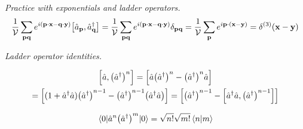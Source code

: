\documentclass{report}
\begin{document}
\begin{subquests}
	\item \emph{Practice with exponentials and ladder operators.}
	\begin{gather*}
		\frac{1}{\cal{V}}\sum_{\vb{pq}} e^{i\pqty{\vb p \cdot\vb x - \vb q \cdot \vb y}}\bqty{\hat{a}_{\vb p}, \hat{a}_{\vb q}^{\dagger}} = \frac{1}{\cal{V}}\sum_{\vb{pq}} e^{i\pqty{\vb p \cdot \vb x - \vb q \cdot \vb y}}\delta_{\vb{pq}} = \frac{1}{\cal{V}}\sum_{\vb p}e^{i \vb p \cdot\pqty{\vb x-\vb y}} = \delta^{(3)}(\vb x - \vb y)
	\end{gather*}

	\item \emph{Ladder operator identities.}
	\begin{subquests}
		\item
		\begin{gather*}
			\bqty{\hat{a},\pqty{\hat{a}^{\dagger}}^n} = \bqty{\hat{a}\pqty{\hat{a}^{\dagger}}^n - \pqty{\hat{a}^{\dagger}}^n\hat{a}} \\
			= \bqty{(1+\hat{a}^{\dagger}\hat{a})\pqty{\hat{a}^{\dagger}}^{n-1} - \pqty{\hat{a}^{\dagger}}^{n-1}\pqty{\hat{a}^{\dagger}\hat{a}}} = \bqty{\pqty{\hat{a}^{\dagger}}^{n-1} - \bqty{\hat{a}^{\dagger}\hat{a},\pqty{\hat{a}^{\dagger}}^{n-1}}}
		\end{gather*}

		\item
		\begin{gather*}
			\mel{0}{\hat{a}^n \pqty{\hat{a}^{\dagger}}^m}{0} = \sqrt{n!}\sqrt{m!}\braket{n}{m}
		\end{gather*}

		\item

		\item
	\end{subquests}
	

\end{subquests}
\end{document}
